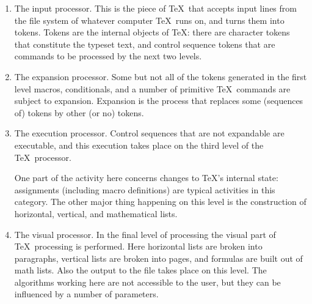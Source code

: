 \documentclass{book}
\begin{document}
\begin{enumerate}\item
The input processor. This is the piece of \TeX\ that
accepts input lines from the file system of whatever computer
\TeX\ runs on, and turns them into tokens.
Tokens are the internal objects of \TeX:
there are character tokens that constitute the typeset
text, and control sequence tokens that are commands 
to be processed by the next two levels.
\item The expansion processor. 
Some but not all of the tokens generated in the first level
\ldash macros, conditionals, and a number
of primitive \TeX\ commands \rdash  are subject to expansion.
Expansion is the process that replaces some (sequences of)
tokens by other (or no) tokens.
\item The execution processor. 
Control sequences that are not expandable are executable,
and this execution takes place on the third level of the
\TeX\ processor.

One part of the activity here concerns changes to
\TeX's internal state: assignments (including
macro definitions) are typical activities in this
category. The other major thing happening on this level
is the construction of horizontal, vertical, and
mathematical lists.
\item The visual processor. 
In the final level of processing
the visual part of \TeX\ processing is performed. Here
horizontal lists are broken into paragraphs, 
vertical lists are broken into pages,
and  formulas are built out of math lists. 
Also the output to the  file takes place on this level.
The algorithms working here are not accessible to the user,
but they can be influenced by a number of parameters.
\end{enumerate}
\end{document}
